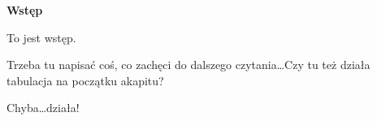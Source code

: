 \begin{center}
    \bfseries Wstęp
\end{center}

To jest wstęp.

Trzeba tu napisać coś, co zachęci do dalszego czytania\ldots Czy tu też działa tabulacja na początku akapitu?

Chyba\ldots działa!